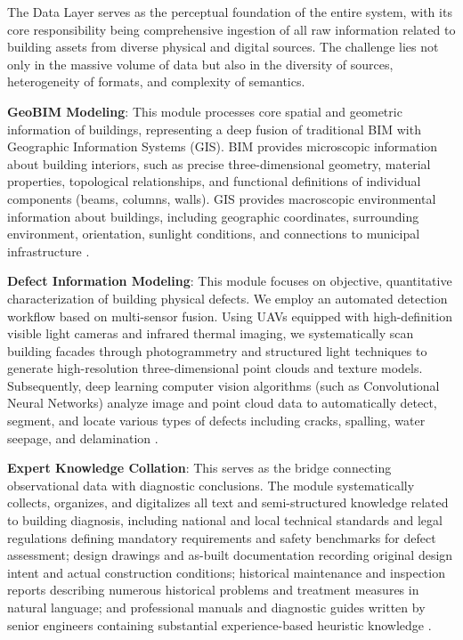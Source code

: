 The Data Layer serves as the perceptual foundation of the entire system, with its core responsibility being comprehensive ingestion of all raw information related to building assets from diverse physical and digital sources. The challenge lies not only in the massive volume of data but also in the diversity of sources, heterogeneity of formats, and complexity of semantics.

\textbf{GeoBIM Modeling}: This module processes core spatial and geometric information of buildings, representing a deep fusion of traditional BIM with Geographic Information Systems (GIS). BIM provides microscopic information about building interiors, such as precise three-dimensional geometry, material properties, topological relationships, and functional definitions of individual components (beams, columns, walls). GIS provides macroscopic environmental information about buildings, including geographic coordinates, surrounding environment, orientation, sunlight conditions, and connections to municipal infrastructure \cite{boje2020towards}.

\textbf{Defect Information Modeling}: This module focuses on objective, quantitative characterization of building physical defects. We employ an automated detection workflow based on multi-sensor fusion. Using UAVs equipped with high-definition visible light cameras and infrared thermal imaging, we systematically scan building facades through photogrammetry and structured light techniques to generate high-resolution three-dimensional point clouds and texture models. Subsequently, deep learning computer vision algorithms (such as Convolutional Neural Networks) analyze image and point cloud data to automatically detect, segment, and locate various types of defects including cracks, spalling, water seepage, and delamination \cite{spencer2019advances}.

\textbf{Expert Knowledge Collation}: This serves as the bridge connecting observational data with diagnostic conclusions. The module systematically collects, organizes, and digitalizes all text and semi-structured knowledge related to building diagnosis, including national and local technical standards and legal regulations defining mandatory requirements and safety benchmarks for defect assessment; design drawings and as-built documentation recording original design intent and actual construction conditions; historical maintenance and inspection reports describing numerous historical problems and treatment measures in natural language; and professional manuals and diagnostic guides written by senior engineers containing substantial experience-based heuristic knowledge \cite{hamdan2021semantic}.

